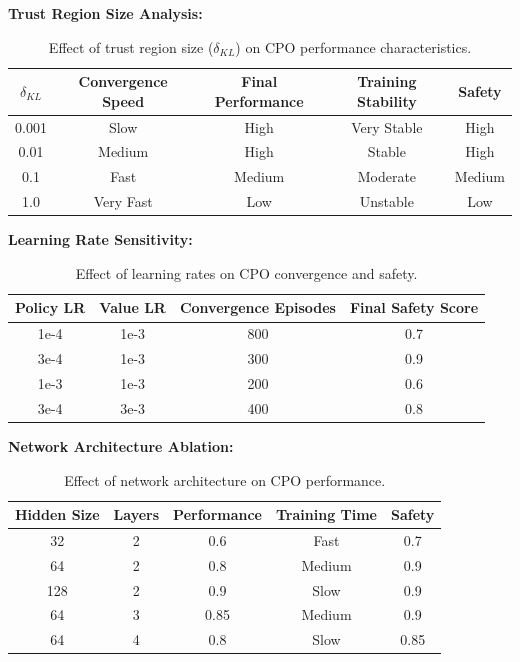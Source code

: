 \documentclass[12pt]{article}
\begin{document}
{{{{\textbf{Trust Region Size Analysis:}
\begin{table}[H]
\centering
\begin{tabular}{|c|c|c|c|c|}
\hline
\textbf{$\delta_{KL}$} & \textbf{Convergence Speed} & \textbf{Final Performance} & \textbf{Training Stability} & \textbf{Safety} \\
\hline
0.001 & Slow & High & Very Stable & High \\
0.01 & Medium & High & Stable & High \\
0.1 & Fast & Medium & Moderate & Medium \\
1.0 & Very Fast & Low & Unstable & Low \\
\hline
\end{tabular}
\caption{Effect of trust region size ($\delta_{KL}$) on CPO performance characteristics.}
\end{table}

\textbf{Learning Rate Sensitivity:}
\begin{table}[H]
\centering
\begin{tabular}{|c|c|c|c|}
\hline
\textbf{Policy LR} & \textbf{Value LR} & \textbf{Convergence Episodes} & \textbf{Final Safety Score} \\
\hline
1e-4 & 1e-3 & 800 & 0.7 \\
3e-4 & 1e-3 & 300 & 0.9 \\
1e-3 & 1e-3 & 200 & 0.6 \\
3e-4 & 3e-3 & 400 & 0.8 \\
\hline
\end{tabular}
\caption{Effect of learning rates on CPO convergence and safety.}
\end{table}

\textbf{Network Architecture Ablation:}
\begin{table}[H]
\centering
\begin{tabular}{|c|c|c|c|c|}
\hline
\textbf{Hidden Size} & \textbf{Layers} & \textbf{Performance} & \textbf{Training Time} & \textbf{Safety} \\
\hline
32 & 2 & 0.6 & Fast & 0.7 \\
64 & 2 & 0.8 & Medium & 0.9 \\
128 & 2 & 0.9 & Slow & 0.9 \\
64 & 3 & 0.85 & Medium & 0.9 \\
64 & 4 & 0.8 & Slow & 0.85 \\
\hline
\end{tabular}
\caption{Effect of network architecture on CPO performance.}
\end{table}

}}}}
\end{document}

